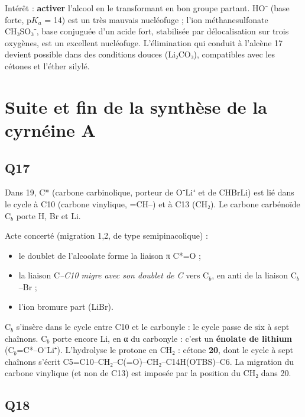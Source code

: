 \documentclass[11pt,a4paper]{article}
\providecommand{\tightlist}{\setlength{\itemsep}{0pt}\setlength{\parskip}{0pt}}
\begin{document}
Intérêt : \textbf{activer} l'alcool en le transformant en bon groupe partant. HO⁻ (base forte, p\(K_a\) = 14) est un très mauvais nucléofuge ; l'ion méthanesulfonate CH₃SO₃⁻, base conjuguée d'un acide fort, stabilisée par délocalisation sur trois oxygènes, est un excellent nucléofuge. L'élimination qui conduit à l'alcène 17 devient possible dans des conditions douces (Li₂CO₃), compatibles avec les cétones et l'éther silylé.

\hypertarget{suite-et-fin-de-la-synthuxe8se-de-la-cyrnuxe9ine-a}{%
\section{Suite et fin de la synthèse de la cyrnéine A}\label{suite-et-fin-de-la-synthuxe8se-de-la-cyrnuxe9ine-a}}

\hypertarget{q17}{%
\subsection{Q17}\label{q17}}

Dans 19, C* (carbone carbinolique, porteur de O⁻Li⁺ et de CHBrLi) est lié dans le cycle à C10 (carbone vinylique, =CH--) et à C13 (CH₂). Le carbone carbénoïde C\(_b\) porte H, Br et Li.

Acte concerté (migration 1,2, de type semipinacolique) :

\begin{itemize}
\tightlist
\item
  le doublet de l'alcoolate forme la liaison π C*=O ;
\item
  la liaison C\emph{--C10 migre avec son doublet de C} vers C\(_b\), en anti de la liaison C\(_b\)--Br ;
\item
  l'ion bromure part (LiBr).
\end{itemize}

C\(_b\) s'insère dans le cycle entre C10 et le carbonyle : le cycle passe de six à sept chaînons. C\(_b\) porte encore Li, en α du carbonyle : c'est un \textbf{énolate de lithium} (C\(_b\)=C*--O⁻Li⁺). L'hydrolyse le protone en CH₂ : cétone \textbf{20}, dont le cycle à sept chaînons s'écrit C5=C10--\allowbreak{}CH₂--\allowbreak{}C(=O)--\allowbreak{}CH₂--\allowbreak{}C14H(OTBS)--\allowbreak{}C6. La migration du carbone vinylique (et non de C13) est imposée par la position du CH₂ dans 20.

\hypertarget{q18}{%
\subsection{Q18}\label{q18}}
\end{document}
